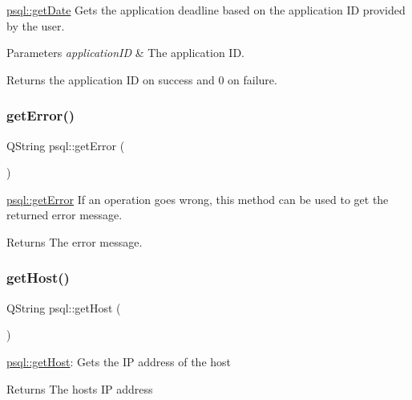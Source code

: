 \hyperlink{classpsql_a561f96bfe7e9d092077712dd6b186af8}{psql\+::get\+Date} Gets the application deadline based on the application ID provided by the user. 


\begin{DoxyParams}{Parameters}
{\em application\+ID} & The application ID. \\
\hline
\end{DoxyParams}
\begin{DoxyReturn}{Returns}
the application ID on success and 0 on failure. 
\end{DoxyReturn}
\mbox{\label{classpsql_a5f51e254b67ff932f287df2184ccc043}} 
\subsubsection{\texorpdfstring{get\+Error()}{getError()}}
{\footnotesize\ttfamily Q\+String psql\+::get\+Error (\begin{DoxyParamCaption}{ }\end{DoxyParamCaption})}



\hyperlink{classpsql_a5f51e254b67ff932f287df2184ccc043}{psql\+::get\+Error} If an operation goes wrong, this method can be used to get the returned error message. 

\begin{DoxyReturn}{Returns}
The error message. 
\end{DoxyReturn}
\mbox{\label{classpsql_a95d06ee661db0b9cf72605b983b04613}} 
\subsubsection{\texorpdfstring{get\+Host()}{getHost()}}
{\footnotesize\ttfamily Q\+String psql\+::get\+Host (\begin{DoxyParamCaption}{ }\end{DoxyParamCaption})}



\hyperlink{classpsql_a95d06ee661db0b9cf72605b983b04613}{psql\+::get\+Host}\+: Gets the IP address of the host 

\begin{DoxyReturn}{Returns}
The host\textquotesingle{}s IP address 
\end{DoxyReturn}
\mbox{\label{classpsql_a817e5a88f877cac6f843c1e743aec096}} 
